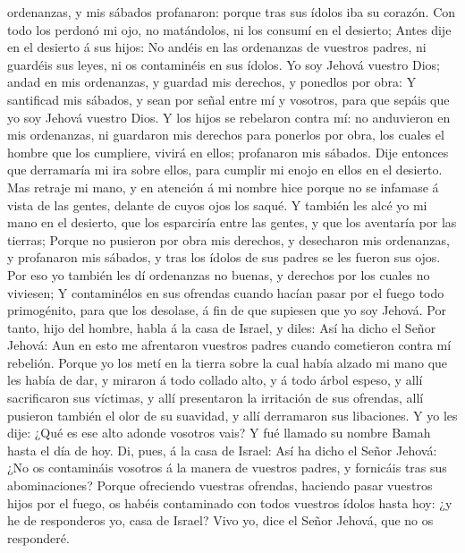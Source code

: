 ordenanzas, y mis sábados profanaron: porque tras sus ídolos iba su
corazón.  Con todo los perdonó mi ojo, no matándolos, ni
los consumí en el desierto;  Antes dije en el desierto á
sus hijos: No andéis en las ordenanzas de vuestros padres, ni guardéis
sus leyes, ni os contaminéis en sus ídolos.  Yo soy Jehová
vuestro Dios; andad en mis ordenanzas, y guardad mis derechos, y
ponedlos por obra:  Y santificad mis sábados, y sean por
señal entre mí y vosotros, para que sepáis que yo soy Jehová vuestro
Dios.  Y los hijos se rebelaron contra mí: no anduvieron en
mis ordenanzas, ni guardaron mis derechos para ponerlos por obra, los
cuales el hombre que los cumpliere, vivirá en ellos; profanaron mis
sábados. Dije entonces que derramaría mi ira sobre ellos, para cumplir
mi enojo en ellos en el desierto.  Mas retraje mi mano, y
en atención á mi nombre hice porque no se infamase á vista de las
gentes, delante de cuyos ojos los saqué.  Y también les
alcé yo mi mano en el desierto, que los esparciría entre las gentes, y
que los aventaría por las tierras;  Porque no pusieron por
obra mis derechos, y desecharon mis ordenanzas, y profanaron mis
sábados, y tras los ídolos de sus padres se les fueron sus ojos.
 Por eso yo también les dí ordenanzas no buenas, y derechos
por los cuales no viviesen;  Y contaminélos en sus ofrendas
cuando hacían pasar por el fuego todo primogénito, para que los
desolase, á fin de que supiesen que yo soy Jehová.  Por
tanto, hijo del hombre, habla á la casa de Israel, y diles: Así ha dicho
el Señor Jehová: Aun en esto me afrentaron vuestros padres cuando
cometieron contra mí rebelión.  Porque yo los metí en la
tierra sobre la cual había alzado mi mano que les había de dar, y
miraron á todo collado alto, y á todo árbol espeso, y allí sacrificaron
sus víctimas, y allí presentaron la irritación de sus ofrendas, allí
pusieron también el olor de su suavidad, y allí derramaron sus
libaciones.  Y yo les dije: ¿Qué es ese alto adonde
vosotros vais? Y fué llamado su nombre Bamah hasta el día de hoy.
 Di, pues, á la casa de Israel: Así ha dicho el Señor
Jehová: ¿No os contamináis vosotros á la manera de vuestros padres, y
fornicáis tras sus abominaciones?  Porque ofreciendo
vuestras ofrendas, haciendo pasar vuestros hijos por el fuego, os habéis
contaminado con todos vuestros ídolos hasta hoy: ¿y he de responderos
yo, casa de Israel? Vivo yo, dice el Señor Jehová, que no os responderé.

